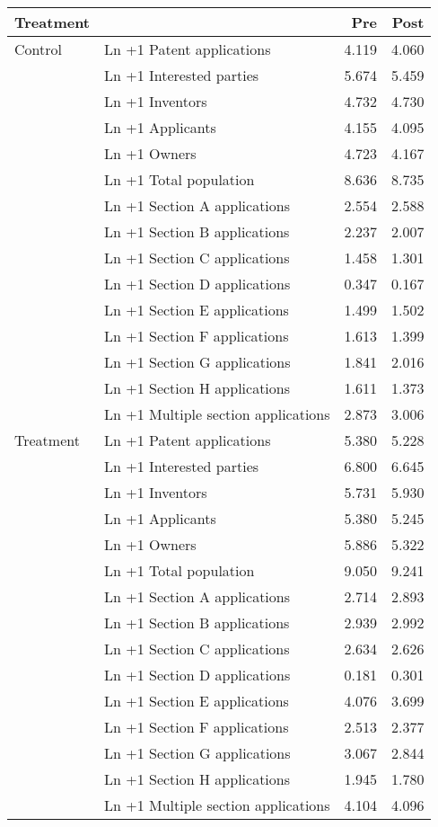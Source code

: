 
\begin{tabular}[t]{llrr}
\toprule
Treatment &   & Pre & Post\\
\midrule
Control & Ln +1 Patent applications & \num{4.119} & \num{4.060}\\
 & Ln +1 Interested parties & \num{5.674} & \num{5.459}\\
 & Ln +1 Inventors & \num{4.732} & \num{4.730}\\
 & Ln +1 Applicants & \num{4.155} & \num{4.095}\\
 & Ln +1 Owners & \num{4.723} & \num{4.167}\\
 & Ln +1 Total population & \num{8.636} & \num{8.735}\\
 & Ln +1 Section A applications & \num{2.554} & \num{2.588}\\
 & Ln +1 Section B applications & \num{2.237} & \num{2.007}\\
 & Ln +1 Section C applications & \num{1.458} & \num{1.301}\\
 & Ln +1 Section D applications & \num{0.347} & \num{0.167}\\
 & Ln +1 Section E applications & \num{1.499} & \num{1.502}\\
 & Ln +1 Section F applications & \num{1.613} & \num{1.399}\\
 & Ln +1 Section G applications & \num{1.841} & \num{2.016}\\
 & Ln +1 Section H applications & \num{1.611} & \num{1.373}\\
 & Ln +1 Multiple section applications & \num{2.873} & \num{3.006}\\
Treatment & Ln +1 Patent applications & \num{5.380} & \num{5.228}\\
 & Ln +1 Interested parties & \num{6.800} & \num{6.645}\\
 & Ln +1 Inventors & \num{5.731} & \num{5.930}\\
 & Ln +1 Applicants & \num{5.380} & \num{5.245}\\
 & Ln +1 Owners & \num{5.886} & \num{5.322}\\
 & Ln +1 Total population & \num{9.050} & \num{9.241}\\
 & Ln +1 Section A applications & \num{2.714} & \num{2.893}\\
 & Ln +1 Section B applications & \num{2.939} & \num{2.992}\\
 & Ln +1 Section C applications & \num{2.634} & \num{2.626}\\
 & Ln +1 Section D applications & \num{0.181} & \num{0.301}\\
 & Ln +1 Section E applications & \num{4.076} & \num{3.699}\\
 & Ln +1 Section F applications & \num{2.513} & \num{2.377}\\
 & Ln +1 Section G applications & \num{3.067} & \num{2.844}\\
 & Ln +1 Section H applications & \num{1.945} & \num{1.780}\\
 & Ln +1 Multiple section applications & \num{4.104} & \num{4.096}\\
\bottomrule
\end{tabular}
